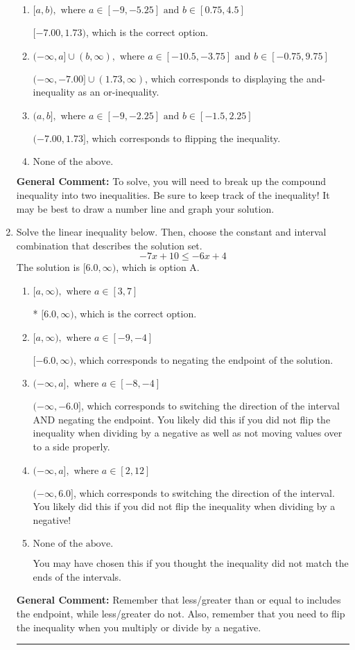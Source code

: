 \documentclass{extbook}[14pt]
\newcommand{\litem}[1]{\item #1

\rule{\textwidth}{0.4pt}}
\begin{document}
\begin{enumerate}
{\begin{enumerate}[label=\Alph*.]
$(-\infty, -7.00) \cup [1.73, \infty)$, which corresponds to displaying the and-inequality as an or-inequality AND flipping the inequality.
\item \( [a, b), \text{ where } a \in [-9, -5.25] \text{ and } b \in [0.75, 4.5] \)

$[-7.00, 1.73)$, which is the correct option.
\item \( (-\infty, a] \cup (b, \infty), \text{ where } a \in [-10.5, -3.75] \text{ and } b \in [-0.75, 9.75] \)

$(-\infty, -7.00] \cup (1.73, \infty)$, which corresponds to displaying the and-inequality as an or-inequality.
\item \( (a, b], \text{ where } a \in [-9, -2.25] \text{ and } b \in [-1.5, 2.25] \)

$(-7.00, 1.73]$, which corresponds to flipping the inequality.
\item \( \text{None of the above.} \)


\end{enumerate}

\textbf{General Comment:} To solve, you will need to break up the compound inequality into two inequalities. Be sure to keep track of the inequality! It may be best to draw a number line and graph your solution.
}
\litem{
Solve the linear inequality below. Then, choose the constant and interval combination that describes the solution set.
\[ -7x + 10 \leq -6x + 4 \]The solution is \( [6.0, \infty) \), which is option A.\begin{enumerate}[label=\Alph*.]
\item \( [a, \infty), \text{ where } a \in [3, 7] \)

* $[6.0, \infty)$, which is the correct option.
\item \( [a, \infty), \text{ where } a \in [-9, -4] \)

 $[-6.0, \infty)$, which corresponds to negating the endpoint of the solution.
\item \( (-\infty, a], \text{ where } a \in [-8, -4] \)

 $(-\infty, -6.0]$, which corresponds to switching the direction of the interval AND negating the endpoint. You likely did this if you did not flip the inequality when dividing by a negative as well as not moving values over to a side properly.
\item \( (-\infty, a], \text{ where } a \in [2, 12] \)

 $(-\infty, 6.0]$, which corresponds to switching the direction of the interval. You likely did this if you did not flip the inequality when dividing by a negative!
\item \( \text{None of the above}. \)

You may have chosen this if you thought the inequality did not match the ends of the intervals.
\end{enumerate}

\textbf{General Comment:} Remember that less/greater than or equal to includes the endpoint, while less/greater do not. Also, remember that you need to flip the inequality when you multiply or divide by a negative.
}
\end{enumerate}
\end{document}
